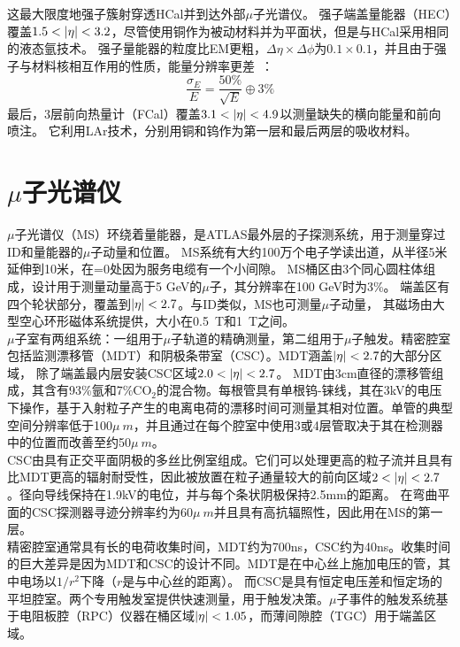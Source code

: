 这最大限度地强子簇射穿透HCal并到达外部$\mu$子光谱仪。 强子端盖量能器（HEC）覆盖$1.5<\abseta<3.2$，尽管使用铜作为被动材料并为平面状，但是与HCal采用相同的液态氩技术。 强子量能器的粒度比EM更粗，$\Delta \eta\times\Delta\phi$为$0.1\times0.1$，并且由于强子与材料核相互作用的性质，能量分辨率更差~\cite{ATLAS_Collaboration_2008}：
\begin{equation}
\frac{\sigma_{E}}{E}=\frac{50\%}{\sqrt{E}}\oplus3\%
\end{equation}
最后，3层前向热量计（FCal）覆盖$3.1<\abseta<4.9$以测量缺失的横向能量和前向喷注。 它利用LAr技术，分别用铜和钨作为第一层和最后两层的吸收材料。

\section{$\mu$子光谱仪}
$\mu$子光谱仪（MS）环绕着量能器，是ATLAS最外层的子探测系统，用于测量穿过ID和量能器的$\mu$子动量和位置。 MS系统有大约100万个电子学读出道，从半径5米延伸到10米，在\abseta =0处因为服务电缆有一个小间隙。
MS桶区由3个同心圆柱体组成，设计用于测量动量高于5 GeV的$\mu$子，其分辨率在100 GeV时为3\%。 端盖区有四个轮状部分，覆盖到$|\eta|<2.7$。与ID类似，MS也可测量$\mu$子动量，
其磁场由大型空心环形磁体系统提供，大小在0.5~T和1~T之间。\\
$\mu$子室有两组系统：一组用于$\mu$子轨道的精确测量，第二组用于$\mu$子触发。精密腔室包括监测漂移管（MDT）\cite{Bauer:2016gyg}和阴极条带室（CSC）\cite{Argyropoulos:2009zz}。MDT涵盖$|\eta|<2.7$的大部分区域，
 除了端盖最内层安装CSC区域$2.0<\abseta<2.7$。
 MDT由3cm直径的漂移管组成，其含有93\%氩和7\%CO$_{2}$的混合物。每根管具有单根钨-铼线，其在3kV的电压下操作，基于入射粒子产生的电离电荷的漂移时间可测量其相对位置。单管的典型空间分辨率低于100$\mu~m$，并且通过在每个腔室中使用3或4层管取决于其在检测器中的位置而改善至约50$\mu~m$。\\
 CSC由具有正交平面阴极的多丝比例室组成。它们可以处理更高的粒子流并且具有比MDT更高的辐射耐受性，因此被放置在粒子通量较大的前向区域$2<\abseta<2.7$。径向导线保持在1.9kV的电位，并与每个条状阴极保持2.5mm的距离。 在弯曲平面的CSC探测器寻迹分辨率约为60$\mu~m$并且具有高抗辐照性，因此用在MS的第一层。\\
 精密腔室通常具有长的电荷收集时间，MDT约为700ns，CSC约为40ns。收集时间的巨大差异是因为MDT和CSC的设计不同。MDT是在中心丝上施加电压的管，其中电场以$1/r^{2}$下降（$r$是与中心丝的距离）。
而CSC是具有恒定电压差和恒定场的平坦腔室。两个专用触发室提供快速测量，用于触发决策。$\mu$子事件的触发系统基于电阻板腔（RPC）\cite{Aielli:2006hg}仪器在桶区域$|\eta|<1.05$，而薄间隙腔（TGC）\cite{Majewski:1984ag}用于端盖区域。 
